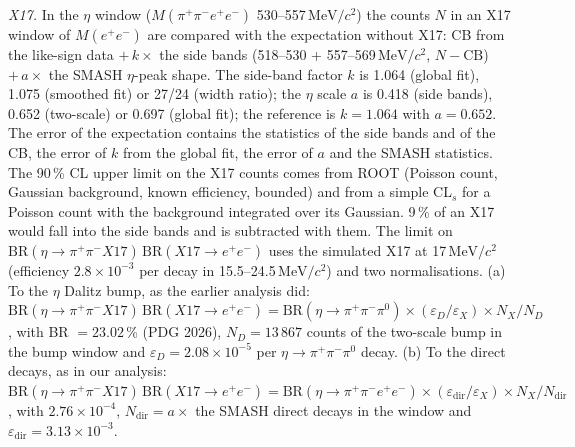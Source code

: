 \documentclass[11pt,a4paper]{article}
\newcommand{\piz}{\ensuremath{\pi^{0}}\xspace}
\newcommand{\ee}{\ensuremath{e^{+}e^{-}}\xspace}
\newcommand{\pipi}{\ensuremath{\pi^{+}\pi^{-}}\xspace}
\newcommand{\ppee}{\ensuremath{\pi^{+}\pi^{-}e^{+}e^{-}}\xspace}
\newcommand{\Mfour}{\ensuremath{M(\pi^{+}\pi^{-}e^{+}e^{-})}\xspace}
\newcommand{\Mee}{\ensuremath{M(e^{+}e^{-})}\xspace}
\newcommand{\MeVcc}{\ensuremath{\mathrm{MeV}/c^{2}}\xspace}
\newcommand{\code}[1]{\texttt{\detokenize{#1}}}
\newcommand{\BRX}{\ensuremath{\mathrm{BR}(\eta\to\pipi X17)\,\mathrm{BR}(X17\to\ee)}\xspace}
\begin{document}
\emph{X17.} In the $\eta$ window (\Mfour 530--557\,\MeVcc) the counts $N$ in an X17 window of \Mee are compared with the expectation
without X17: CB from the like-sign data $+\,k\times$ the side bands (518--530 + 557--569\,\MeVcc, $N-\mathrm{CB}$) $+\,a\times$ the SMASH
$\eta$-peak shape. The side-band factor $k$ is 1.064 (global fit), 1.075 (smoothed fit) or 27/24 (width ratio); the $\eta$ scale $a$ is 0.418
(side bands), 0.652 (two-scale) or 0.697 (global fit); the reference is $k=1.064$ with $a=0.652$. The error of the expectation contains the
statistics of the side bands and of the CB, the error of $k$ from the global fit, the error of $a$ and the SMASH statistics. The 90\,\% CL
upper limit on the X17 counts comes from ROOT \code{TRolke} (Poisson count, Gaussian background, known efficiency, bounded) and from a simple
CL$_s$ for a Poisson count with the background integrated over its Gaussian. 9\,\% of an X17 would fall into the side bands and is subtracted
with them. The limit on \BRX uses the simulated X17 at 17\,\MeVcc (efficiency $2.8\times10^{-3}$ per decay in 15.5--24.5\,\MeVcc) and two
normalisations. (a) To the $\eta$ Dalitz bump, as the earlier analysis did: $\BRX=\mathrm{BR}(\eta\to\pipi\piz)\times(\varepsilon_D/
\varepsilon_X)\times N_X/N_D$, with BR $=23.02$\,\% (PDG 2026), $N_D=13\,867$ counts of the two-scale bump in the bump window and
$\varepsilon_D=2.08\times10^{-5}$ per $\eta\to\pipi\piz$ decay. (b) To the direct decays, as in our analysis:
$\BRX=\mathrm{BR}(\eta\to\ppee)\times(\varepsilon_{\mathrm{dir}}/\varepsilon_X)\times N_X/N_{\mathrm{dir}}$, with $2.76\times10^{-4}$,
$N_{\mathrm{dir}}=a\times$ the SMASH direct decays in the window and $\varepsilon_{\mathrm{dir}}=3.13\times10^{-3}$.
\end{document}
